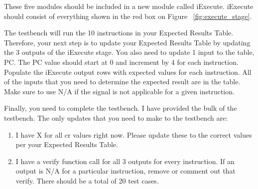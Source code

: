 These five modules should be included in a new module called iExecute.  iExecute should consist of everything shown in the red box on Figure ~\ref{fig:execute_stage}. 

The testbench will run the 10 instructions in your Expected Results Table.  Therefore, your next step is to update your Expected Results Table by updating the 3 outputs of the iExecute stage. You also need to update 1 input to the table, PC.  The PC value should start at 0 and increment by 4 for each instruction.  Populate the iExecute output rows with expected values for each instruction.  All of the inputs that you need to determine the expected result are in the table.  Make sure to use N/A if the signal is not applicable for a given instruction.

Finally, you need to complete the testbench.  I have provided the bulk of the testbench.  The only updates that you need to make to the testbench are:
\begin{enumerate}
	\item I have X for all cr values right now.  Please update these to the correct values per your Expected Results Table.
	\item I have a verify function call for all 3 outputs for every instruction.  If an output is N/A for a particular instruction, remove or comment out that verify.  There should be a total of 20 test cases.  
\end{enumerate}   


